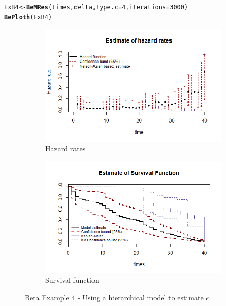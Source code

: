 \documentclass[letterpaper]{article}\usepackage[]{graphicx}\usepackage[]{color}
\makeatletter
\newcommand{\hlnum}[1]{\textcolor[rgb]{0.686,0.059,0.569}{#1}}%
\newcommand{\hlstd}[1]{\textcolor[rgb]{0.345,0.345,0.345}{#1}}%
\newcommand{\hlkwb}[1]{\textcolor[rgb]{0.69,0.353,0.396}{#1}}%
\newcommand{\hlkwc}[1]{\textcolor[rgb]{0.333,0.667,0.333}{#1}}%
\newcommand{\hlkwd}[1]{\textcolor[rgb]{0.737,0.353,0.396}{\textbf{#1}}}%
\newenvironment{kframe}{%
 \def\at@end@of@kframe{}%
 \ifinner\ifhmode%
  \def\at@end@of@kframe{\end{minipage}}%
  \begin{minipage}{\columnwidth}%
 \fi\fi%
 \def\FrameCommand##1{\hskip\@totalleftmargin \hskip-\fboxsep
 \colorbox{shadecolor}{##1}\hskip-\fboxsep
     \hskip-\linewidth \hskip-\@totalleftmargin \hskip\columnwidth}%
 \MakeFramed {\advance\hsize-\width
   \@totalleftmargin\z@ \linewidth\hsize
   \@setminipage}}%
 {\par\unskip\endMakeFramed%
 \at@end@of@kframe}
\newenvironment{knitrout}{}{} %
\makeatother
\begin{document}
\begin{knitrout}
\color{fgcolor}\begin{kframe}
\begin{alltt}
\hlstd{ExB4} \hlkwb{<-} \hlkwd{BeMRes}\hlstd{(times, delta,} \hlkwc{type.c} \hlstd{=} \hlnum{4}\hlstd{,} \hlkwc{iterations} \hlstd{=} \hlnum{3000}\hlstd{)}
\hlkwd{BePloth}\hlstd{(ExB4)}
\end{alltt}
\end{kframe}
\end{knitrout}

\begin{figure}
  \centering
  \begin{subfigure}[a]{\textwidth}\centering
    \includegraphics[width=\textwidth]{B41.png}
    \caption{Hazard rates}
  \end{subfigure}
  \begin{subfigure}[b]{\textwidth}\centering
    \includegraphics[width=\textwidth]{B42.png}
    \caption{Survival function}
  \end{subfigure}
  \caption{Beta Example 4 - Using a hierarchical model to estimate $c$}
  \label{fig:B4}
\end{figure}
\end{document}
